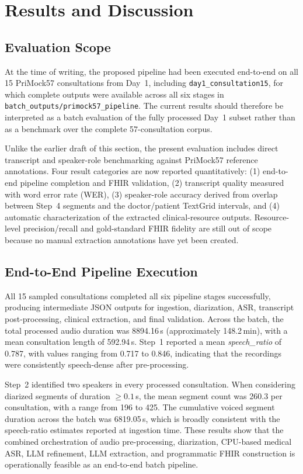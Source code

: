 \section{Results and Discussion}

\subsection{Evaluation Scope}

At the time of writing, the proposed pipeline had been executed end-to-end on all 15 PriMock57 consultations from Day~1, including \texttt{day1\_consultation15}, for which complete outputs were available across all six stages in \texttt{batch\_outputs/primock57\_pipeline}. The current results should therefore be interpreted as a batch evaluation of the fully processed Day~1 subset rather than as a benchmark over the complete 57-consultation corpus.

Unlike the earlier draft of this section, the present evaluation includes direct transcript and speaker-role benchmarking against PriMock57 reference annotations. Four result categories are now reported quantitatively: (1) end-to-end pipeline completion and FHIR validation, (2) transcript quality measured with word error rate (WER), (3) speaker-role accuracy derived from overlap between Step~4 segments and the doctor/patient TextGrid intervals, and (4) automatic characterization of the extracted clinical-resource outputs. Resource-level precision/recall and gold-standard FHIR fidelity are still out of scope because no manual extraction annotations have yet been created.

\subsection{End-to-End Pipeline Execution}

All 15 sampled consultations completed all six pipeline stages successfully, producing intermediate JSON outputs for ingestion, diarization, ASR, transcript post-processing, clinical extraction, and final validation. Across the batch, the total processed audio duration was 8894.16\,s (approximately 148.2\,min), with a mean consultation length of 592.94\,s. Step~1 reported a mean \textit{speech\_ratio} of 0.787, with values ranging from 0.717 to 0.846, indicating that the recordings were consistently speech-dense after pre-processing.

Step~2 identified two speakers in every processed consultation. When considering diarized segments of duration $\geq 0.1$\,s, the mean segment count was 260.3 per consultation, with a range from 196 to 425. The cumulative voiced segment duration across the batch was 6819.05\,s, which is broadly consistent with the speech-ratio estimates reported at ingestion time. These results show that the combined orchestration of audio pre-processing, diarization, CPU-based medical ASR, LLM refinement, LLM extraction, and programmatic FHIR construction is operationally feasible as an end-to-end batch pipeline.

